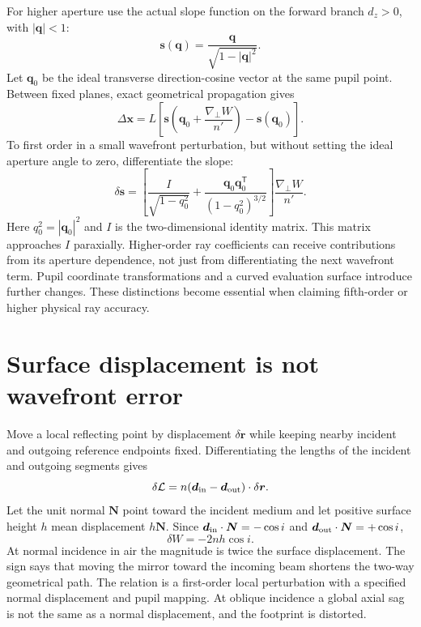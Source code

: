 For higher aperture use the actual slope function on the forward branch $d_z>0$, with $|\bm{q}|<1$:
\[
\bm{s}(\bm{q})=\frac{\bm{q}}{\sqrt{1-|\bm{q}|^2}}.
\]
Let $\bm{q}_0$ be the ideal transverse direction-cosine vector at the same pupil point. Between fixed planes, exact geometrical propagation gives
\begin{equation}
\Delta\bm{x}=L\left[
\bm{s}\left(\bm{q}_0+\frac{\nabla_\perp W}{n'}\right)
-\bm{s}(\bm{q}_0)\right].
\label{fnd:exact-slope}
\end{equation}
To first order in a small wavefront perturbation, but without setting the ideal aperture angle to zero, differentiate the slope:
\[
\delta\bm{s}=
\left[\frac{I}{\sqrt{1-q_0^2}}
+\frac{\bm{q}_0\bm{q}_0^{\mathsf T}}{(1-q_0^2)^{3/2}}\right]
\frac{\nabla_\perp W}{n'}.
\]
Here $q_0^2=|\bm{q}_0|^2$ and $I$ is the two-dimensional identity matrix. This matrix approaches $I$ paraxially. Higher-order ray coefficients can receive contributions from its aperture dependence, not just from differentiating the next wavefront term. Pupil coordinate transformations and a curved evaluation surface introduce further changes. These distinctions become essential when claiming fifth-order or higher physical ray accuracy.

\section{Surface displacement is not wavefront error}
Move a local reflecting point by displacement $\delta\bm{r}$ while keeping nearby incident and outgoing reference endpoints fixed. Differentiating the lengths of the incident and outgoing segments gives
\[
\delta\mathcal{L}=n(\bm{d}_{\rm in}-\bm{d}_{\rm out})\cdot\delta\bm{r}.
\]
Let the unit normal $\bm{N}$ point toward the incident medium and let positive surface height $h$ mean displacement $h\bm{N}$. Since $\bm{d}_{\rm in}\cdot\bm{N}=-\cos i$ and $\bm{d}_{\rm out}\cdot\bm{N}=+\cos i$,
\begin{equation}
\boxed{\delta W=-2nh\cos i.}
\label{fnd:mirrorheight}
\end{equation}
At normal incidence in air the magnitude is twice the surface displacement. The sign says that moving the mirror toward the incoming beam shortens the two-way geometrical path. The relation is a first-order local perturbation with a specified normal displacement and pupil mapping. At oblique incidence a global axial sag is not the same as a normal displacement, and the footprint is distorted.

